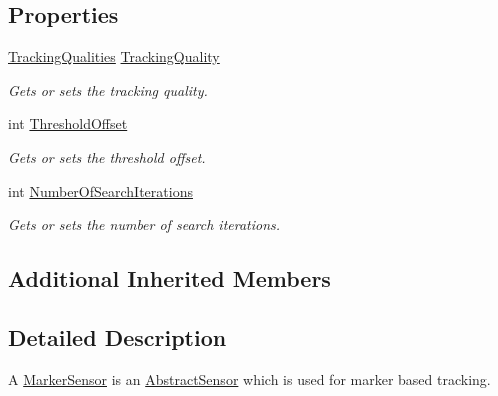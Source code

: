 \subsection*{Properties}
\begin{DoxyCompactItemize}
\item 
\hyperlink{class_a_rdev_kit_1_1_model_1_1_project_1_1_marker_sensor_adf403b5a2cee12e9f0006bd431cf569f}{Tracking\-Qualities} \hyperlink{class_a_rdev_kit_1_1_model_1_1_project_1_1_marker_sensor_ad8681106fa33f5473799f0e0ed6999bc}{Tracking\-Quality}
\begin{DoxyCompactList}\small\item\em Gets or sets the tracking quality. \end{DoxyCompactList}\item 
int \hyperlink{class_a_rdev_kit_1_1_model_1_1_project_1_1_marker_sensor_a704b4bc065e8b27d457c2cfbedee7a79}{Threshold\-Offset}
\begin{DoxyCompactList}\small\item\em Gets or sets the threshold offset. \end{DoxyCompactList}\item 
int \hyperlink{class_a_rdev_kit_1_1_model_1_1_project_1_1_marker_sensor_a106f06e0fb75947b4748a392e7a520b7}{Number\-Of\-Search\-Iterations}
\begin{DoxyCompactList}\small\item\em Gets or sets the number of search iterations. \end{DoxyCompactList}\end{DoxyCompactItemize}
\subsection*{Additional Inherited Members}


\subsection{Detailed Description}
A \hyperlink{class_a_rdev_kit_1_1_model_1_1_project_1_1_marker_sensor}{Marker\-Sensor} is an \hyperlink{class_a_rdev_kit_1_1_model_1_1_project_1_1_abstract_sensor}{Abstract\-Sensor} which is used for marker based tracking. 



